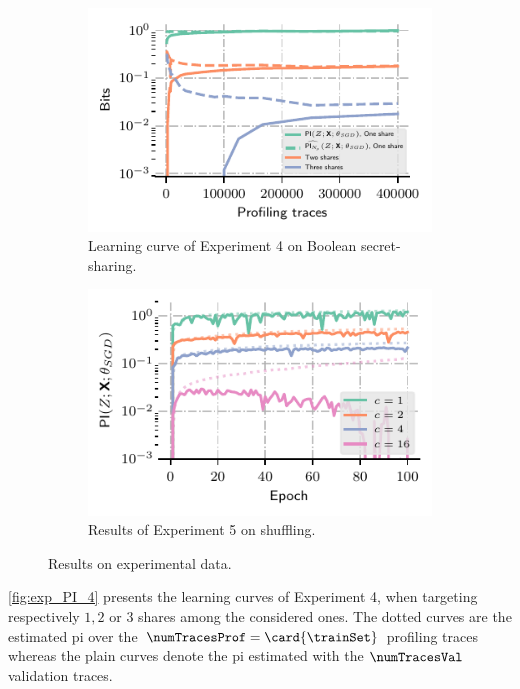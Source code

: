 \begin{figure}
    \centering
    \begin{subfigure}{0.49\textwidth}
        \includegraphics{Figures/experiments/learning_curves_05}
        \caption{Learning curve of Experiment 4 on Boolean secret-sharing.}
        \label{fig:exp_PI_4}
    \end{subfigure}
    \begin{subfigure}{0.49\textwidth}
        \includegraphics{Figures/experiments/PI_shuffle_4_bits}
        \caption{Results of Experiment 5 on shuffling.}
        \label{fig:exp_PI_5}
    \end{subfigure}
    \caption{Results on experimental data.}
    \label{fig:exp_PI}
\end{figure}
\autoref{fig:exp_PI_4} presents the learning curves of Experiment 4, when targeting respectively \(1, 2\) or \(3\) shares among the considered ones.
The dotted curves are the estimated \gls{pi} over the \(\numTracesProf = \card{\trainSet}\) profiling traces whereas the plain curves denote the \gls{pi} estimated with the \(\numTracesVal\) validation traces.
  
